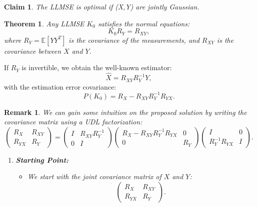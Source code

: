 \documentclass[a4 paper]{article}
\numberwithin{equation}{section}
\theoremstyle{boldStyle}
\newtheorem{remark}{Remark}[section]
\theoremstyle{boldBlueStyle}
\newtheorem{claim}{Claim}[section]
\theoremstyle{boldPurpleStyle}
\newtheorem{theorem}{Theorem}[section]
\theoremstyle{boldRedStyle}
\theoremstyle{boldGreenStyle}
\begin{document}
\begin{claim}
  The LLMSE is optimal if (X,Y) are jointly Gaussian.
\end{claim}


\begin{theorem}
  Any LLMSE \( K_0 \) satisfies the normal equations:
  \[
  K_0 R_Y = R_{XY},
  \]
  where \( R_Y = \mathbb{E}[YY^T] \) is the covariance of the measurements, and \( R_{XY} \) is the covariance between \( X \) and \( Y \).
  \end{theorem}
  
  If \( R_Y \) is invertible, we obtain the well-known estimator:
  \[
  \hat{X} = R_{XY} R_Y^{-1} Y,
  \]
  with the estimation error covariance:
  \[
  P(K_0) = R_X - R_{XY} R_Y^{-1} R_{YX}.
  \]
  
  \begin{remark}
  We can gain some intuition on the proposed solution by writing the covariance matrix using a UDL factorization:
  \[
  \begin{pmatrix}
  R_X & R_{XY} \\
  R_{YX} & R_Y
  \end{pmatrix} =
  \begin{pmatrix}
  I & R_{XY} R_Y^{-1} \\
  0 & I
  \end{pmatrix}
  \begin{pmatrix}
  R_X - R_{XY} R_Y^{-1} R_{YX} & 0 \\
  0 & R_Y
  \end{pmatrix}
  \begin{pmatrix}
  I & 0 \\
  R_Y^{-1} R_{YX} & I
  \end{pmatrix}.
  \]
  
  \begin{enumerate}
      \item \textbf{Starting Point:}
      \begin{itemize}
          \item We start with the joint covariance matrix of \( X \) and \( Y \):
          \[
          \begin{pmatrix}
          R_X & R_{XY} \\
          R_{YX} & R_Y
          \end{pmatrix}.
          \]
      \end{itemize}
      

\end{enumerate}
\end{remark}
\end{document}
